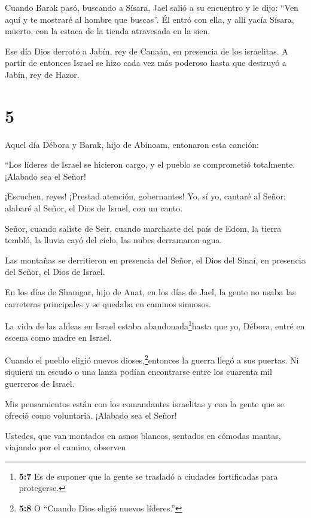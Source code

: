  Cuando Barak pasó, buscando a Sísara, Jael salió a su
encuentro y le dijo: ``Ven aquí y te mostraré al hombre que buscas''. Él
entró con ella, y allí yacía Sísara, muerto, con la estaca de la tienda
atravesada en la sien.

 Ese día Dios derrotó a Jabín, rey de Canaán, en presencia
de los israelitas.  A partir de entonces Israel se hizo
cada vez más poderoso hasta que destruyó a Jabín, rey de Hazor.

\hypertarget{section-4}{%
\section{5}\label{section-4}}

 Aquel día Débora y Barak, hijo de Abinoam, entonaron esta
canción:

 ``Los líderes de Israel se hicieron cargo, y el pueblo se
comprometió totalmente. ¡Alabado sea el Señor!

 ¡Escuchen, reyes! ¡Prestad atención, gobernantes! Yo, sí
yo, cantaré al Señor; alabaré al Señor, el Dios de Israel, con un canto.

 Señor, cuando saliste de Seir, cuando marchaste del país de
Edom, la tierra tembló, la lluvia cayó del cielo, las nubes derramaron
agua.

 Las montañas se derritieron en presencia del Señor, el Dios
del Sinaí, en presencia del Señor, el Dios de Israel.

 En los días de Shamgar, hijo de Anat, en los días de Jael,
la gente no usaba las carreteras principales y se quedaba en caminos
sinuosos.

 La vida de las aldeas en Israel estaba
abandonada\footnote{\textbf{5:7} Es de suponer que la gente se trasladó
  a ciudades fortificadas para protegerse.}hasta que yo, Débora, entré
en escena como madre en Israel.

 Cuando el pueblo eligió nuevos dioses,\footnote{\textbf{5:8}
  O ``Cuando Dios eligió nuevos líderes.''}entonces la guerra llegó a
sus puertas. Ni siquiera un escudo o una lanza podían encontrarse entre
los cuarenta mil guerreros de Israel.

 Mis pensamientos están con los comandantes israelitas y con
la gente que se ofreció como voluntaria. ¡Alabado sea el Señor!

 Ustedes, que van montados en asnos blancos, sentados en
cómodas mantas, viajando por el camino, observen


